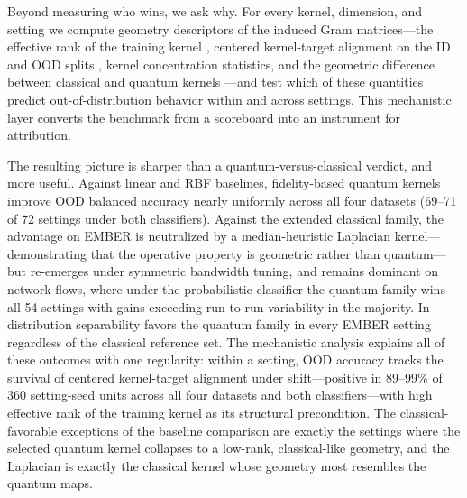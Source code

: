 \documentclass[journal]{IEEEtran}
\begin{document}
Beyond measuring who wins, we ask why. For every kernel, dimension, and setting we compute geometry descriptors of the induced Gram matrices---the effective rank of the training kernel \cite{roy2007effective}, centered kernel-target alignment on the ID and OOD splits \cite{cristianini2001kta,cortes2012centeredalignment}, kernel concentration statistics, and the geometric difference between classical and quantum kernels \cite{huang2021powerofdata}---and test which of these quantities predict out-of-distribution behavior within and across settings. This mechanistic layer converts the benchmark from a scoreboard into an instrument for attribution.

The resulting picture is sharper than a quantum-versus-classical verdict, and more useful. Against linear and RBF baselines, fidelity-based quantum kernels improve OOD balanced accuracy nearly uniformly across all four datasets (69--71 of 72 settings under both classifiers). Against the extended classical family, the advantage on EMBER is neutralized by a median-heuristic Laplacian kernel---demonstrating that the operative property is geometric rather than quantum---but re-emerges under symmetric bandwidth tuning, and remains dominant on network flows, where under the probabilistic classifier the quantum family wins all 54 settings with gains exceeding run-to-run variability in the majority. In-distribution separability favors the quantum family in every EMBER setting regardless of the classical reference set. The mechanistic analysis explains all of these outcomes with one regularity: within a setting, OOD accuracy tracks the survival of centered kernel-target alignment under shift---positive in 89--99\% of 360 setting-seed units across all four datasets and both classifiers---with high effective rank of the training kernel as its structural precondition. The classical-favorable exceptions of the baseline comparison are exactly the settings where the selected quantum kernel collapses to a low-rank, classical-like geometry, and the Laplacian is exactly the classical kernel whose geometry most resembles the quantum maps.
\end{document}
